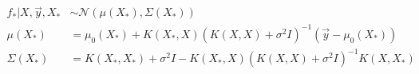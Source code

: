 \documentclass{IOS-Book-Article}
\begin{document}
	\begin{equation} \label{eq:predictive_posterior}
		\begin{aligned}
			f_*|X,\vec{y},X_* & \sim \mathcal{N}(\mu(X_*), \Sigma(X_*)) \\
			\mu(X_*) & = \mu_0(X_*) + K(X_*,X)(K(X,X) + \sigma^2 I)^{-1}(\vec{y} - \mu_0(X_*)) \\
			\Sigma(X_*) & = K(X_*,X_*) + \sigma^2 I - K(X_*,X)(K(X,X) + \sigma^2 I)^{-1} K(X,X_*)
		\end{aligned}
	\end{equation}	


	
\end{document}
